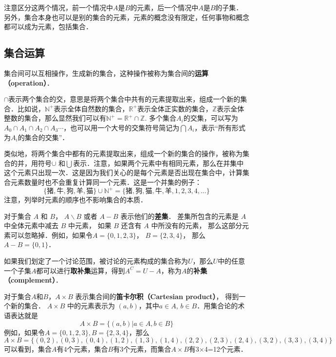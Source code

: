 注意区分这两个情况，前一个情况中$A$是$B$的元素，后一个情况中$A$是$B$的子集．另外，集合本身也可以是别的集合的元素，元素的概念没有限定，任何事物和概念都可以成为元素，包括集合．





\subsection{集合运算}

集合间可以互相操作，生成新的集合，这种操作被称为集合间的\textbf{运算（operation）}．

$\cap$表示两个集合的交，意思是将两个集合中共有的元素提取出来，组成一个新的集合．比如说，$\mathbb{N^+}$表示全体自然数的集合，$\mathbb{R^+}$表示全体正实数的集合，$\mathbb{Z}$表示全体整数的集合，那么显然我们可以有$\mathbb{N^+}=\mathbb{R^+}\cap\mathbb{Z}$. 多个集合$A_i$的交集，可以写为$A_0\cap A_1\cap A_2\cap A_3⋯$，也可以用一个大号的交集符号简记为$\bigcap A_i$，表示“所有形式为$A_i$的集合的交集”．

类似地，将两个集合中都有的元素提取出来，组成一个新的集合的操作，被称为集合的并，用符号$\cup$ 和$\bigcup$表示．注意，如果两个元素中有相同元素，那么在并集中这个元素只出现一次．这是因为我们关心的是每个元素是否出现在集合中，计算集合元素数量时也不会重复计算同一个元素．这是一个并集的例子：
\begin{equation}
\{\text{猪}, \text{牛}, \text{狗}, \text{羊}, \text{猫}\}\cup\mathbb{N^+}=\{\text{猪}, \text{狗}, \text{猫}, \text{牛}, \text{羊}, 1, 2,3,4,\dots\}
\end{equation}
注意，列举时元素的顺序也不影响集合的本质．

对于集合 $A$ 和 $B$， $A\backslash B$ 或者 $A-B$ 表示他们的\textbf{差集}． 差集所包含的元素是 $A$ 中全体元素中减去 $B$ 中元素， 如果 $B$ 还含有 $A$ 中所没有的元素， 那么这部分元素可以忽略掉．例如，如果令$A=\{0,1,2,3\}$， $B=\{2,3,4\}$， 那么 $A-B=\{0,1\}$．

如果我们划定了一个讨论范围，被讨论的元素构成的集合称为$U$，那么$U$中的任意一个子集$A$都可以进行\textbf{取补集}运算，得到$A^C=U-A$，称为$A$的\textbf{补集（complement）}．

对于集合$A$和$B$，$A\times B$ 表示集合间的\textbf{笛卡尔积（Cartesian product）}， 得到一个新的集合． $A\times B$ 中的元素表示为 $(a,b)$，其中$a\in A$, $b\in B$．用集合论的术语表达就是
\begin{equation}
A\times B=\{(a,b)|a\in A, b\in B\}
\end{equation}
例如，如果令$A=\{0,1,2,3\}, B=\{2,3,4\}$，那么
\begin{equation}
A\times B=\{ (0,2),(0,3),(0,4),(1,2),(1,3),(1,4),(2,2),(2,3),(2,4),(3,2),(3,3),(3,4) \}
\end{equation}
可以看到，集合$A$有4个元素，集合$B$有3个元素，而集合$A\times B$有3$\times$4=12个元素．

